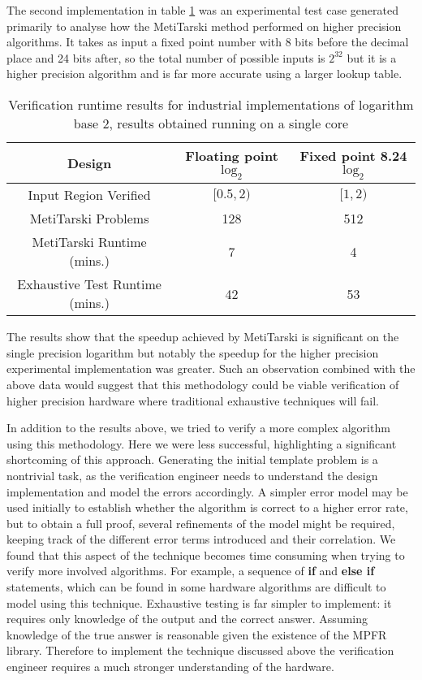 \documentclass[a4]{article}
\begin{document}
The second implementation in table \ref{result} was an experimental test case generated primarily to analyse how the MetiTarski method performed on higher precision algorithms. It takes as input a fixed point number with 8 bits before the decimal place and 24 bits after, so the total number of possible inputs is $2^{32}$ but it is a higher precision algorithm and is far more accurate using a larger lookup table.

\begin{center}
\begin{table}[h!]
\centering
\begin{tabular}{ccc} 
\toprule
 Design & Floating point $\log_2$ & Fixed point 8.24 $\log_2$    \\
\midrule
 Input Region Verified& $[0.5,2)$ & $[1,2) $ \\ 
 MetiTarski Problems & 128 & 512 \\
 MetiTarski Runtime (mins.) &  7 & 4 \\ 
 Exhaustive Test Runtime (mins.) & 42 & 53 \\ 
\bottomrule
\end{tabular}
\caption{Verification runtime results for industrial implementations of logarithm base 2, results obtained running on a single core}
\label{result}
\end{table}
\end{center}

The results show that the speedup achieved by MetiTarski is significant on the single precision logarithm but notably the speedup for the higher precision experimental implementation was greater. Such an observation combined with the above data would suggest that this methodology could be viable verification of higher precision hardware where traditional exhaustive techniques will fail. 

In addition to the results above, we tried to verify a more complex algorithm using this methodology. Here we were less successful, highlighting a significant shortcoming of this approach. Generating the initial template problem is a nontrivial task, as the verification engineer needs to understand the design implementation and model the errors accordingly. A simpler error model may be used initially to establish whether the algorithm is correct to a higher error rate, but to obtain a full proof, several refinements of the model might be required, keeping track of the different error terms introduced and their correlation. We found that this aspect of the technique becomes time consuming when trying to verify more involved algorithms. For example, a sequence of \textbf{if} and \textbf{else if} statements, which can be found in some hardware algorithms are difficult to model using this technique. Exhaustive testing is far simpler to implement: it requires only knowledge of the output and the correct answer. Assuming knowledge of the true answer is reasonable given the existence of the MPFR library. Therefore to implement the technique discussed above the verification engineer requires a much stronger understanding of the hardware.
 
\end{document}

